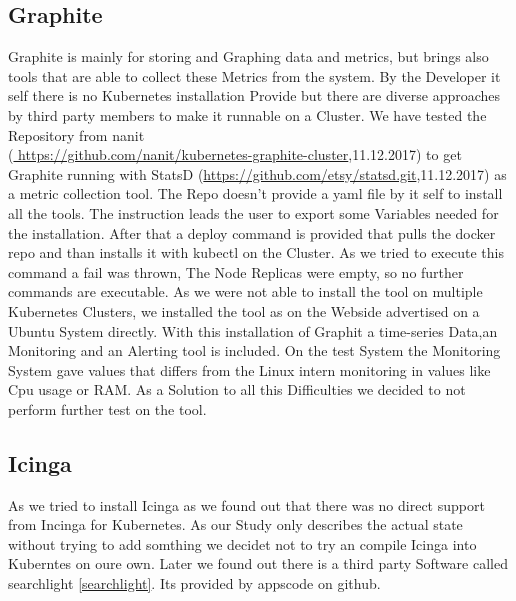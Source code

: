 \subsection{Graphite}
Graphite is mainly for storing and Graphing data and metrics, but brings also tools that are able to collect these Metrics from the system. By the Developer it self there is no Kubernetes installation Provide but there are diverse approaches by third party members to make it runnable on a Cluster. We have tested the Repository from nanit\\(\url{ https://github.com/nanit/kubernetes-graphite-cluster},11.12.2017) to get Graphite running with StatsD (\url{https://github.com/etsy/statsd.git},11.12.2017) as a metric collection tool. The Repo doesn't provide a yaml file by it self to install all the tools. The instruction leads the user to export some Variables needed for the installation. After that a deploy command is provided that pulls the docker repo and than installs it with kubectl on the Cluster. As we tried to execute this command a fail was thrown, The Node Replicas were empty, so no further commands are executable. As we were not able to install the tool on multiple Kubernetes Clusters, we installed the tool as on the Webside advertised on a Ubuntu System directly. With this installation of Graphit a time-series Data,an Monitoring and an Alerting tool is included. On the test System the Monitoring System gave values that differs from the Linux intern monitoring in values like Cpu usage or RAM. As a Solution to all this Difficulties we decided to not perform further test on the tool.

\subsection{Icinga}
\label{Icinga}
As we tried to install Icinga as we found out that there was no direct support from Incinga for Kubernetes. As our Study only describes the actual state without trying to add somthing we decidet not to try an compile Icinga into Kuberntes on oure own. Later we found out there is a third party Software called searchlight \ref{searchlight}. Its provided by appscode on github.
 